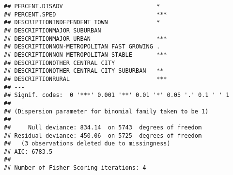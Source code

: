\documentclass[
]{article}
\newenvironment{Shaded}{\begin{snugshade}}{\end{snugshade}}
\newcommand{\DataTypeTok}[1]{\textcolor[rgb]{0.13,0.29,0.53}{#1}}
\newcommand{\DecValTok}[1]{\textcolor[rgb]{0.00,0.00,0.81}{#1}}
\newcommand{\FloatTok}[1]{\textcolor[rgb]{0.00,0.00,0.81}{#1}}
\newcommand{\KeywordTok}[1]{\textcolor[rgb]{0.13,0.29,0.53}{\textbf{#1}}}
\newcommand{\NormalTok}[1]{#1}
\newcommand{\OperatorTok}[1]{\textcolor[rgb]{0.81,0.36,0.00}{\textbf{#1}}}
\newcommand{\StringTok}[1]{\textcolor[rgb]{0.31,0.60,0.02}{#1}}
\begin{document}
\begin{verbatim}
## PERCENT.DISADV                           *  
## PERCENT.SPED                             ***
## DESCRIPTIONINDEPENDENT TOWN              *  
## DESCRIPTIONMAJOR SUBURBAN                   
## DESCRIPTIONMAJOR URBAN                   ***
## DESCRIPTIONNON-METROPOLITAN FAST GROWING .  
## DESCRIPTIONNON-METROPOLITAN STABLE       ***
## DESCRIPTIONOTHER CENTRAL CITY               
## DESCRIPTIONOTHER CENTRAL CITY SUBURBAN   ** 
## DESCRIPTIONRURAL                         ***
## ---
## Signif. codes:  0 '***' 0.001 '**' 0.01 '*' 0.05 '.' 0.1 ' ' 1
## 
## (Dispersion parameter for binomial family taken to be 1)
## 
##     Null deviance: 834.14  on 5743  degrees of freedom
## Residual deviance: 450.06  on 5725  degrees of freedom
##   (3 observations deleted due to missingness)
## AIC: 6783.5
## 
## Number of Fisher Scoring iterations: 4
\end{verbatim}

\begin{Shaded}
\end{Shaded}
\end{document}
